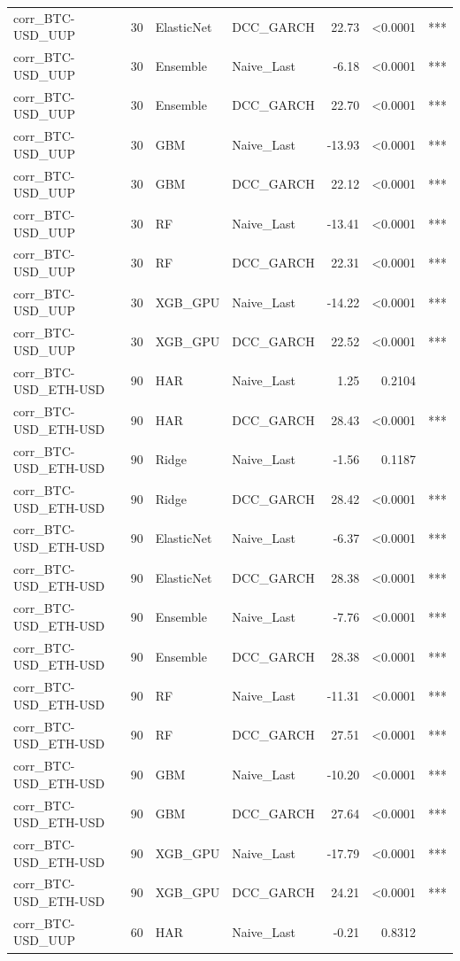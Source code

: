 \begin{table}[H]
\begin{tabular}{llllrrl}
corr_BTC-USD_UUP & 30 & ElasticNet & DCC_GARCH & 22.73 & <0.0001 & *** \\
corr_BTC-USD_UUP & 30 & Ensemble & Naive_Last & -6.18 & <0.0001 & *** \\
corr_BTC-USD_UUP & 30 & Ensemble & DCC_GARCH & 22.70 & <0.0001 & *** \\
corr_BTC-USD_UUP & 30 & GBM & Naive_Last & -13.93 & <0.0001 & *** \\
corr_BTC-USD_UUP & 30 & GBM & DCC_GARCH & 22.12 & <0.0001 & *** \\
corr_BTC-USD_UUP & 30 & RF & Naive_Last & -13.41 & <0.0001 & *** \\
corr_BTC-USD_UUP & 30 & RF & DCC_GARCH & 22.31 & <0.0001 & *** \\
corr_BTC-USD_UUP & 30 & XGB_GPU & Naive_Last & -14.22 & <0.0001 & *** \\
corr_BTC-USD_UUP & 30 & XGB_GPU & DCC_GARCH & 22.52 & <0.0001 & *** \\
corr_BTC-USD_ETH-USD & 90 & HAR & Naive_Last & 1.25 & 0.2104 &  \\
corr_BTC-USD_ETH-USD & 90 & HAR & DCC_GARCH & 28.43 & <0.0001 & *** \\
corr_BTC-USD_ETH-USD & 90 & Ridge & Naive_Last & -1.56 & 0.1187 &  \\
corr_BTC-USD_ETH-USD & 90 & Ridge & DCC_GARCH & 28.42 & <0.0001 & *** \\
corr_BTC-USD_ETH-USD & 90 & ElasticNet & Naive_Last & -6.37 & <0.0001 & *** \\
corr_BTC-USD_ETH-USD & 90 & ElasticNet & DCC_GARCH & 28.38 & <0.0001 & *** \\
corr_BTC-USD_ETH-USD & 90 & Ensemble & Naive_Last & -7.76 & <0.0001 & *** \\
corr_BTC-USD_ETH-USD & 90 & Ensemble & DCC_GARCH & 28.38 & <0.0001 & *** \\
corr_BTC-USD_ETH-USD & 90 & RF & Naive_Last & -11.31 & <0.0001 & *** \\
corr_BTC-USD_ETH-USD & 90 & RF & DCC_GARCH & 27.51 & <0.0001 & *** \\
corr_BTC-USD_ETH-USD & 90 & GBM & Naive_Last & -10.20 & <0.0001 & *** \\
corr_BTC-USD_ETH-USD & 90 & GBM & DCC_GARCH & 27.64 & <0.0001 & *** \\
corr_BTC-USD_ETH-USD & 90 & XGB_GPU & Naive_Last & -17.79 & <0.0001 & *** \\
corr_BTC-USD_ETH-USD & 90 & XGB_GPU & DCC_GARCH & 24.21 & <0.0001 & *** \\
corr_BTC-USD_UUP & 60 & HAR & Naive_Last & -0.21 & 0.8312 &  \\

\end{tabular}
\end{table}
